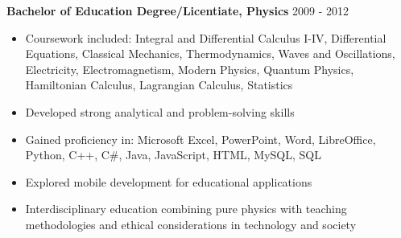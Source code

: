 \documentclass[
]{article}
\providecommand{\tightlist}{%
  \setlength{\itemsep}{0pt}\setlength{\parskip}{0pt}}
\begin{document}
\textbf{Bachelor of Education Degree/Licentiate, Physics} \textbar{}
2009 - 2012

\begin{itemize}
\tightlist
\item
  Coursework included: Integral and Differential Calculus I-IV,
  Differential Equations, Classical Mechanics, Thermodynamics, Waves and
  Oscillations, Electricity, Electromagnetism, Modern Physics, Quantum
  Physics, Hamiltonian Calculus, Lagrangian Calculus, Statistics
\item
  Developed strong analytical and problem-solving skills
\item
  Gained proficiency in: Microsoft Excel, PowerPoint, Word, LibreOffice,
  Python, C++, C\#, Java, JavaScript, HTML, MySQL, SQL
\item
  Explored mobile development for educational applications
\item
  Interdisciplinary education combining pure physics with teaching
  methodologies and ethical considerations in technology and society
\end{itemize}
\end{document}
